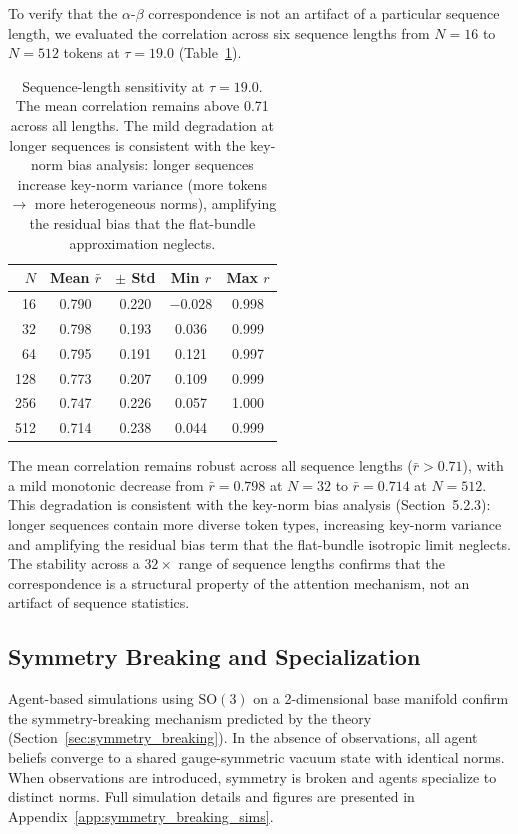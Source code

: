 \documentclass[twoside,11pt]{article}
\begin{document}
To verify that the $\alpha$-$\beta$ correspondence is not an artifact of a particular sequence length, we evaluated the correlation across six sequence lengths from $N = 16$ to $N = 512$ tokens at $\tau = 19.0$ (Table~\ref{tab:seqlen}).

\begin{table}[h]
\centering
\renewcommand{\arraystretch}{1.15}
\begin{tabular}{rcccc}
\hline
$N$ & Mean $\bar{r}$ & $\pm$ Std & Min $r$ & Max $r$ \\
\hline
16  & 0.790 & 0.220 & $-0.028$ & 0.998 \\
32  & 0.798 & 0.193 & 0.036    & 0.999 \\
64  & 0.795 & 0.191 & 0.121    & 0.997 \\
128 & 0.773 & 0.207 & 0.109    & 0.999 \\
256 & 0.747 & 0.226 & 0.057    & 1.000 \\
512 & 0.714 & 0.238 & 0.044    & 0.999 \\
\hline
\end{tabular}
\caption{Sequence-length sensitivity at $\tau = 19.0$. The mean correlation remains above 0.71 across all lengths. The mild degradation at longer sequences is consistent with the key-norm bias analysis: longer sequences increase key-norm variance (more tokens $\to$ more heterogeneous norms), amplifying the residual bias that the flat-bundle approximation neglects.}
\label{tab:seqlen}
\end{table}

The mean correlation remains robust across all sequence lengths ($\bar{r} > 0.71$), with a mild monotonic decrease from $\bar{r} = 0.798$ at $N = 32$ to $\bar{r} = 0.714$ at $N = 512$. This degradation is consistent with the key-norm bias analysis (Section~5.2.3): longer sequences contain more diverse token types, increasing key-norm variance and amplifying the residual bias term that the flat-bundle isotropic limit neglects. The stability across a $32\times$ range of sequence lengths confirms that the correspondence is a structural property of the attention mechanism, not an artifact of sequence statistics.


\subsection{Symmetry Breaking and Specialization}

Agent-based simulations using $\mathrm{SO}(3)$ on a 2-dimensional base manifold confirm the symmetry-breaking mechanism predicted by the theory (Section~\ref{sec:symmetry_breaking}). In the absence of observations, all agent beliefs converge to a shared gauge-symmetric vacuum state with identical norms. When observations are introduced, symmetry is broken and agents specialize to distinct norms. Full simulation details and figures are presented in Appendix~\ref{app:symmetry_breaking_sims}.
\end{document}
